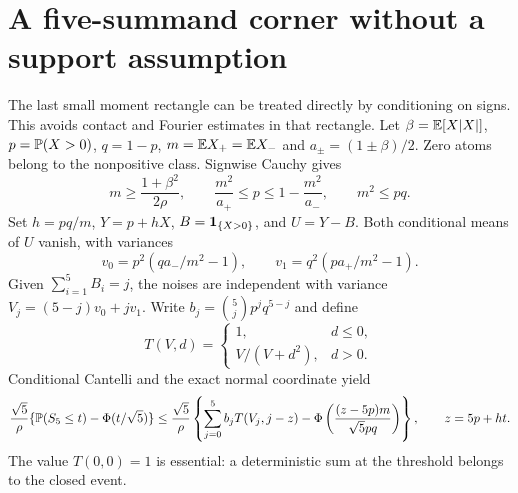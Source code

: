 \section{A five-summand corner without a support assumption}
\label{ext:gapfree5}
The last small moment rectangle can be treated directly by conditioning
on signs. This avoids contact and Fourier estimates in that rectangle.
Let $\beta=\mathbb E[X|X|]$, $p=\mathbb P(X>0)$, $q=1-p$,
$m=\mathbb E X_+=\mathbb E X_-$ and $a_\pm=(1\pm\beta)/2$.
Zero atoms belong to the nonpositive class. Signwise Cauchy gives
\[
 m\ge\frac{1+\beta^2}{2\rho},\qquad
 \frac{m^2}{a_+}\le p\le1-\frac{m^2}{a_-},\qquad m^2\le pq.
\]
Set $h=pq/m$, $Y=p+hX$, $B=\mathbf 1_{\{X>0\}}$, and $U=Y-B$.
Both conditional means of $U$ vanish, with variances
\[
 v_0=p^2(qa_-/m^2-1),\qquad v_1=q^2(pa_+/m^2-1).
\]
Given $\sum_{i=1}^5B_i=j$, the noises are independent with variance
$V_j=(5-j)v_0+jv_1$. Write $b_j=\binom5j p^jq^{5-j}$ and define
\[
 T(V,d)=\begin{cases}1,&d\le0,\\V/(V+d^2),&d>0.\end{cases}
\]
Conditional Cantelli and the exact normal coordinate yield
\begin{equation}\label{ext:gapfree-bound}
 \frac{\sqrt5}{\rho}\{\mathbb P(S_5\le t)-\Phi(t/\sqrt5)\}
 \le\frac{\sqrt5}{\rho}
 \left\{\sum_{j=0}^5 b_jT(V_j,j-z)
          -\Phi\left(\frac{(z-5p)m}{\sqrt5pq}\right)\right\},
 \qquad z=5p+ht.
\end{equation}
The value $T(0,0)=1$ is essential: a deterministic sum at the threshold
belongs to the closed event.

